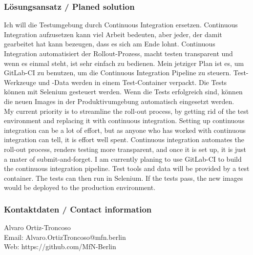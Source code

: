 {\scriptsize
\begin{frame}
  \frametitle{Lösungsansatz / \textcolor{mfn_green}{Planed solution}}
  Ich will die Testumgebung durch Continuous Integration ersetzen. Continuous Integration aufzusetzen kann viel Arbeit bedeuten, aber jeder, der damit gearbeitet hat kann bezeugen, dass es sich am Ende lohnt. Continuous Integration automatisiert der Rollout-Prozess, macht testen transparent und wenn es einmal steht, ist sehr einfach zu bedienen. Mein jetziger Plan ist es, um GitLab-CI zu benutzen, um die Continuous Integration Pipeline zu steuern. Test-Werkzeuge und -Data werden in einem Test-Container verpackt. Die Tests können mit Selenium gesteuert werden. Wenn die Tests erfolgreich sind, können die neuen Images in der Produktivumgebung automatisch eingesetzt werden.\\
  \bigskip
  \textcolor{mfn_green}{My current priority is to streamline the roll-out process, by getting rid of the test environment and replacing it with continuous integration. Setting up continuous integration can be a lot of effort, but as anyone who has worked with continuous integration can tell, it is effort well spent. Continuous integration automates the roll-out process, renders testing more transparent, and once it is set up, it is just a mater of submit-and-forget. I am currently planing to use GitLab-CI to build the continuous integration pipeline. Test tools and data will be provided by a test container. The tests can then run in Selenium. If the tests pass, the new images would be deployed to the production environment.}
\end{frame}
}
\begin{frame}
  \frametitle{Kontaktdaten / \textcolor{mfn_green}{Contact information}}
  \begin{center}
    Alvaro Ortiz-Troncoso \\
    \medskip
    Email: Alvaro.OrtizTroncoso@mfn.berlin \\    
    \medskip
    Web: https://github.com/MfN-Berlin
  \end{center}
\end{frame}




